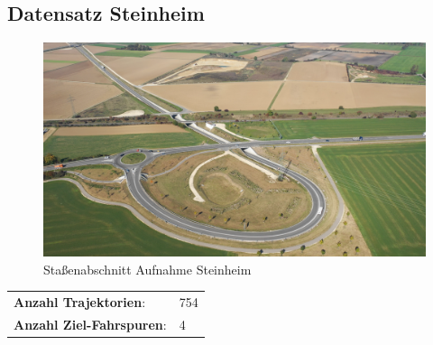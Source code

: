 \subsection*{Datensatz Steinheim}

\begin{minipage}{0.55\textwidth}
    \begin{figure}[H]
        \includegraphics[width=\linewidth]{resources/img/Anhang/Steinheim}
    \caption[]{Staßenabschnitt Aufnahme Steinheim}
    \label{fig:anhang_ds_steinheim}
    \end{figure}
\end{minipage} \hfill
\begin{minipage}{0.35\textwidth}
    \begin{tabular}{ll}
    \textbf{Anzahl Trajektorien}: & 754 \\
    \textbf{Anzahl Ziel-Fahrspuren}: & 4 \\
    \end{tabular}
\end{minipage}